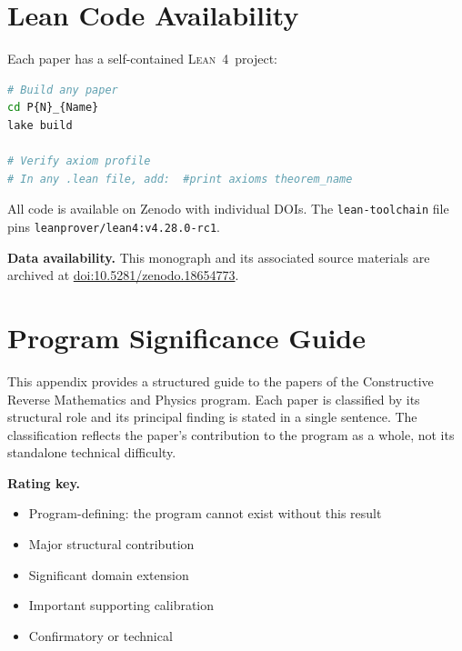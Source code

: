 \documentclass[11pt,a4paper]{report}
\theoremstyle{plain}
\theoremstyle{definition}
\theoremstyle{remark}
\newcommand{\Lean}{\textsc{Lean~4}}
\newcommand{\FiveStar}{$\bigstar\bigstar\bigstar\bigstar\bigstar$}
\newcommand{\FourStar}{$\bigstar\bigstar\bigstar\bigstar$}
\newcommand{\ThreeStar}{$\bigstar\bigstar\bigstar$}
\newcommand{\TwoStar}{$\bigstar\bigstar$}
\newcommand{\OneStar}{$\bigstar$}
\begin{document}
\chapter{Lean Code Availability}

Each paper has a self-contained \Lean\ project:
\begin{lstlisting}[language=bash,backgroundcolor=\color{white},numbers=none]
# Build any paper
cd P{N}_{Name}
lake build

# Verify axiom profile
# In any .lean file, add:  #print axioms theorem_name
\end{lstlisting}

All code is available on Zenodo with individual DOIs. The \texttt{lean-toolchain} file pins \texttt{leanprover/lean4:v4.28.0-rc1}.

\medskip\noindent
\textbf{Data availability.}
This monograph and its associated source materials are archived at
\href{https://doi.org/10.5281/zenodo.18654773}{doi:10.5281/zenodo.18654773}.

\chapter{Program Significance Guide}
\label{app:significance}

This appendix provides a structured guide to the papers of the Constructive Reverse Mathematics and Physics program.  Each paper is classified by its structural role and its principal finding is stated in a single sentence.  The classification reflects the paper's contribution to the program as a whole, not its standalone technical difficulty.

\bigskip\noindent
\textbf{Rating key.}\quad
\begin{itemize}
\item[\FiveStar] Program-defining: the program cannot exist without this result
\item[\FourStar] Major structural contribution
\item[\ThreeStar] Significant domain extension
\item[\TwoStar] Important supporting calibration
\item[\OneStar] Confirmatory or technical
\end{itemize}

\end{document}
